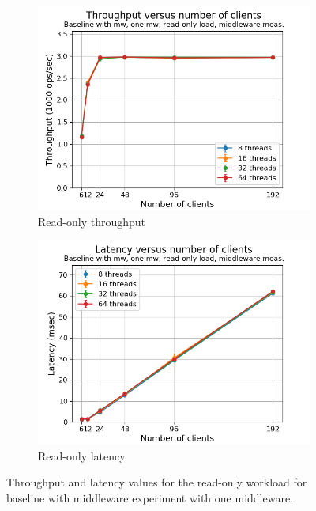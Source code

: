 \documentclass[11pt,a4paper]{article}
\begin{document}
\begin{figure}[h]
\centering
\begin{subfigure}{.5\textwidth}
  \centering
  \includegraphics[width=1.0\linewidth,trim={5px 0px 20px 0px},clip]{img/plot/mwb1-ro-tp_mw.png}
  \caption{Read-only throughput}
  \label{fig:mwb1-ro-tp_mw}
\end{subfigure}%
\begin{subfigure}{.5\textwidth}
  \centering
  \includegraphics[width=1.0\linewidth,trim={5px 0px 20px 0px},clip]{img/plot/mwb1-ro-lat_mw.png}
  \caption{Read-only latency}
  \label{fig:mwb1-ro-lat_mw}
\end{subfigure}
\caption{Throughput and latency values for the read-only workload for baseline with middleware experiment with one middleware.}
\label{fig:mwb1-ro_mw}
\end{figure}
\end{document}

